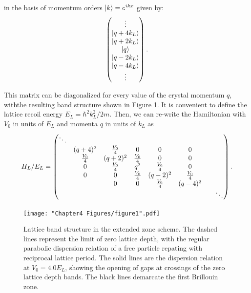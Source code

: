 in the basis of momentum orders $\mathinner{|{k}\rangle}=e^{i k x}$ given by:
\begin{equation}
 \begin{pmatrix} \vdots \\
\mathinner{|{q+4 k_L}\rangle}\\
\mathinner{|{q+2 k_L}\rangle}\\
\mathinner{|{q}\rangle}\\
\mathinner{|{q -2 k_L}\rangle}\\
\mathinner{|{q - 4 k_L}\rangle}\\
\vdots
\end{pmatrix} \\.
\end{equation}

This matrix can be diagonalized for every value of the crystal momentum $q$, withthe resulting band structure shown in Figure \ref{fig:latticeBandStructure}. It is convenient to define the lattice recoil energy $E_L = \hbar^2 k_L^2/2m$. Then, we can re-write the Hamiltonian with $V_0$ in units of $E_L$ and momenta $q$ in units of $k_L$ as 
\begin{equation}
H_L/E_L =
 \begin{pmatrix} \ddots &  & & & & & & \\ 
 & (q + 4)^2 & \frac{V_0}{4} & 0 & 0 & 0 &  \\
 & \frac{V_0}{4} &(q + 2)^2 & \frac{V_0}{4} & 0 & 0 &  \\
& 0 & \frac{V_0}{4} & q^2 & \frac{V_0}{4} & 0 &  \\
 & 0 & 0 & \frac{V_0}{4} & (q - 2)^2 &\frac{V_0}{4} &  \\
 &  & 0 & 0 & \frac{V_0}{4} & (q  - 4)^2 &  \\
& & & & & & &  \ddots \end{pmatrix} \\.
\end{equation}

\begin{figure}
	\texttt{[image: "Chapter4 Figures/figure1".pdf]}
\caption[Lattice band structure in the extended zone scheme]{Lattice band structure in the extended zone scheme. The dashed lines represent the limit of zero lattice depth, with the regular parabolic dispersion relation of a free particle repating with reciprocal lattice period. The solid lines are the dispersion relation at $V_0 = 4.0 E_L$, showing the opening of gaps at crossings of the zero lattice depth bands. The black lines demarcate the first Brillouin zone. }
\label{fig:latticeBandStructure}
\end{figure}

